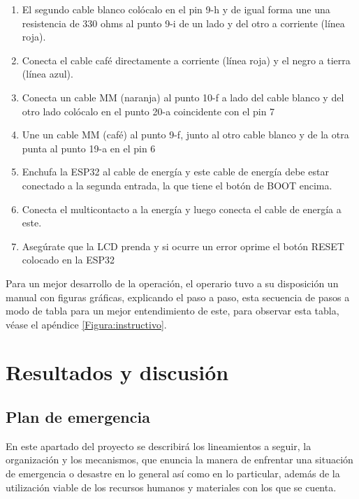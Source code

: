 \begin{enumerate}
        \item El segundo cable blanco colócalo en el pin 9-h y de igual forma une una resistencia de 330 ohms al punto 9-i de un lado y del otro a corriente (línea roja).
    
        \item Conecta el cable café directamente a corriente (línea roja) y el negro a tierra (línea azul). 
    
        \item  Conecta un cable MM (naranja) al punto 10-f a lado del cable blanco y del otro lado colócalo en el punto 20-a coincidente con el pin 7
    
        \item Une un cable MM (café) al punto 9-f, junto al otro cable blanco y de la otra punta al punto 19-a en el pin 6 
    
        \item  Enchufa la ESP32 al cable de energía y este cable de energía debe estar conectado a la segunda entrada, la que tiene el botón de BOOT encima.
    
        \item Conecta el multicontacto a la energía y luego conecta el cable de energía a este.
    
    
        \item Asegúrate que la LCD prenda y si ocurre un error oprime el botón RESET colocado en la ESP32
    
    \end{enumerate}
    
    
    Para un mejor desarrollo de la operación, el operario tuvo a su disposición un manual con figuras gráficas, explicando el paso a paso, esta secuencia de pasos a modo de tabla para un mejor entendimiento de este, para observar esta tabla, véase el apéndice \ref{Figura:instructivo}.
    
    
    
    
    
    
    
    \section{Resultados y discusión}
    \subsection{Plan de emergencia}
    
    En este apartado del proyecto se describirá los lineamientos a seguir, la organización y los mecanismos, que enuncia la manera de enfrentar una situación de emergencia o desastre en lo general
    así como en lo particular, además de la utilización viable de los recursos humanos y materiales con los que se cuenta.
    
